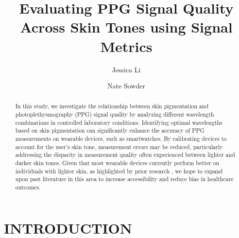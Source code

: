 \documentclass[letterpaper, 10 pt, conference]{ieeeconf}  %
\title{\LARGE \bf
Evaluating PPG Signal Quality Across Skin Tones using Signal Metrics
}
\author[1]{Jessica Li}
\author[1]{Nate Sowder}
\affil[1]{Department of Computer Science, Northwestern University, Evanston, IL}
\begin{document}
\maketitle
\thispagestyle{empty}
\pagestyle{empty}


\begin{abstract}
In this study, we investigate the relationship between skin pigmentation and photoplethysmography (PPG) signal quality by analyzing different wavelength combinations in controlled laboratory conditions. Identifying optimal wavelengths based on skin pigmentation can significantly enhance the accuracy of PPG measurements on wearable devices, such as smartwatches. By calibrating devices to account for the user's skin tone, measurement errors may be reduced, particularly addressing the disparity in measurement quality often experienced between lighter and darker skin tones. Given that most wearable devices currently perform better on individuals with lighter skin, as highlighted by prior research \cite{bent_investigating_2020}, we hope to expand upon past literature in this area to increase accessibility and reduce bias in healthcare outcomes.
\end{abstract}


\section{INTRODUCTION}
\end{document}
